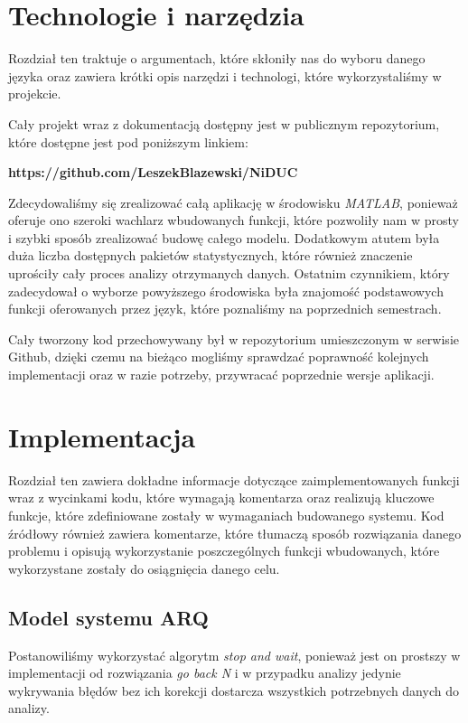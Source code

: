 \documentclass{article}
\begin{document}
\section{Technologie i narzędzia}

Rozdział ten traktuje o argumentach, które skłoniły nas do wyboru danego języka oraz zawiera krótki opis narzędzi i technologi, które wykorzystaliśmy w projekcie.

Cały projekt wraz z dokumentacją dostępny jest w publicznym repozytorium, które dostępne jest pod poniższym linkiem:

\begin{center}
\textbf{https://github.com/LeszekBlazewski/NiDUC}
\end{center}{}

Zdecydowaliśmy się zrealizować całą aplikację w środowisku \textit{MATLAB}, ponieważ oferuje ono szeroki wachlarz wbudowanych funkcji, które pozwoliły nam w prosty i szybki sposób zrealizować budowę całego modelu. Dodatkowym atutem była duża liczba dostępnych pakietów statystycznych, które również znaczenie uprościły cały proces analizy otrzymanych danych. Ostatnim czynnikiem, który zadecydował o wyborze powyższego środowiska była znajomość podstawowych funkcji oferowanych przez język, które poznaliśmy na poprzednich semestrach.

Cały tworzony kod przechowywany był w repozytorium umieszczonym w serwisie Github, dzięki czemu na bieżąco mogliśmy sprawdzać poprawność  kolejnych implementacji oraz w razie potrzeby, przywracać poprzednie wersje aplikacji.

\section{Implementacja}
Rozdział ten zawiera dokładne informacje dotyczące zaimplementowanych funkcji wraz z wycinkami kodu, które wymagają komentarza oraz realizują kluczowe funkcje, które zdefiniowane zostały w wymaganiach budowanego systemu. Kod źródłowy również zawiera komentarze, które tłumaczą sposób rozwiązania danego problemu i opisują wykorzystanie poszczególnych funkcji wbudowanych, które wykorzystane zostały do osiągnięcia danego celu.

\newpage

\subsection{Model systemu ARQ}

Postanowiliśmy wykorzystać algorytm \textit{stop and wait}, ponieważ jest on prostszy w implementacji od rozwiązania \textit{go back N} i w przypadku analizy jedynie wykrywania błędów bez ich korekcji dostarcza wszystkich potrzebnych danych do analizy.
\end{document}
